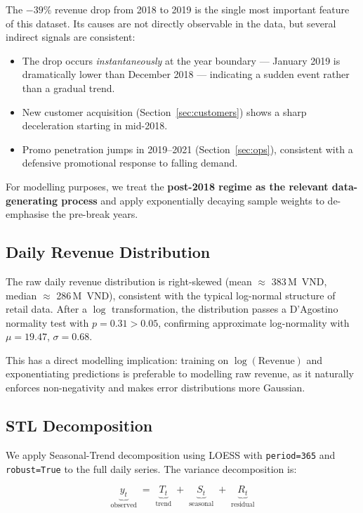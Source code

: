 \documentclass{article}
\begin{document}
The $-39\%$ revenue drop from 2018 to 2019 is the single most important feature
of this dataset.
Its causes are not directly observable in the data, but several indirect signals
are consistent:
\begin{itemize}[leftmargin=1.5em, itemsep=2pt]
  \item The drop occurs \emph{instantaneously} at the year boundary — January
    2019 is dramatically lower than December 2018 — indicating a sudden event
    rather than a gradual trend.
  \item New customer acquisition (Section~\ref{sec:customers}) shows a sharp
    deceleration starting in mid-2018.
  \item Promo penetration jumps in 2019--2021 (Section~\ref{sec:ops}), consistent
    with a defensive promotional response to falling demand.
\end{itemize}

For modelling purposes, we treat the \textbf{post-2018 regime as the relevant
data-generating process} and apply exponentially decaying sample weights to
de-emphasise the pre-break years.

\subsection{Daily Revenue Distribution}

The raw daily revenue distribution is right-skewed (mean $\approx$ 383\,M~VND,
median $\approx$ 286\,M~VND), consistent with the typical log-normal structure of
retail data.
After a $\log$ transformation, the distribution passes a D'Agostino normality
test with $p = 0.31 > 0.05$, confirming approximate log-normality with
$\mu = 19.47$, $\sigma = 0.68$.

This has a direct modelling implication: training on $\log(\text{Revenue})$ and
exponentiating predictions is preferable to modelling raw revenue, as it
naturally enforces non-negativity and makes error distributions more Gaussian.

\subsection{STL Decomposition}

We apply Seasonal-Trend decomposition using LOESS \citep{cleveland1990stl}
with \texttt{period=365} and \texttt{robust=True} to the full daily series.
The variance decomposition is:

\begin{equation}
  \underbrace{y_t}_{\text{observed}} \;=\;
  \underbrace{T_t}_{\text{trend}} \;+\;
  \underbrace{S_t}_{\text{seasonal}} \;+\;
  \underbrace{R_t}_{\text{residual}}
\end{equation}
\end{document}
